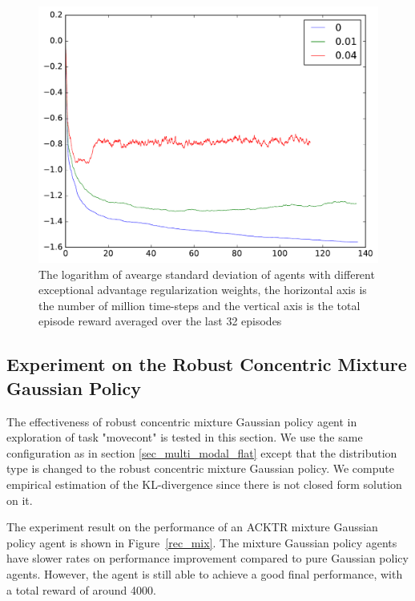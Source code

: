 \begin{figure}[!htbp]
	\includegraphics[width=\textwidth]{images/rec_std_adv_reg.pdf}
	\centering
	\caption{The logarithm of avearge standard deviation of agents with different exceptional advantage regularization weights, the horizontal axis is the number of million time-steps and the vertical axis is the total episode reward averaged over the last 32 episodes}\label{rec_std_adv_reg}
\end{figure}

\subsection{Experiment on the Robust Concentric Mixture Gaussian Policy}
The effectiveness of robust concentric mixture Gaussian policy agent in exploration of task "movecont" is tested in this section. We use the same configuration as in section \ref{sec_multi_modal_flat} except that the distribution type is changed to the robust concentric mixture Gaussian policy. We compute empirical estimation of the KL-divergence since there is not closed form solution on it.

The experiment result on the performance of an ACKTR mixture Gaussian policy agent is shown in Figure~\ref{rec_mix}. The mixture Gaussian policy agents have slower rates on performance improvement compared to pure Gaussian policy agents. However, the agent is still able to achieve a good final performance, with a total reward of around 4000.

